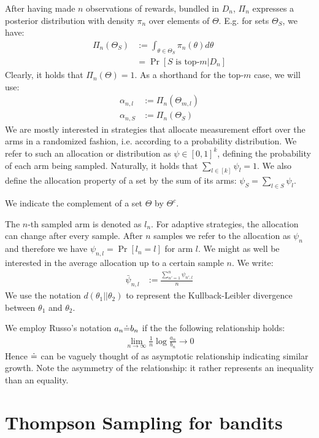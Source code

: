 After having made $n$ observations of rewards, bundled in $D_n$, $\Pi_n$
expresses a posterior distribution with density $\pi_n$ over elements of
$\Theta$. E.g. for sets $\Theta_{S}$, we have:
\begin{align}
  \Pi_n(\Theta_{S}) &:= \int_{\theta \in \Theta_{S}} \pi_n(\theta)
      d\theta \\
    &= \Pr[S \text{ is top-}m | D_n]
\end{align}
Clearly, it holds that $\Pi_n(\Theta) = 1$. As a shorthand for the top-$m$ case, we will use:
\begin{align}
  \alpha_{n, l} &:= \Pi_n(\Theta_{m, l}) \\
  \alpha_{n, S} &:= \Pi_n(\Theta_{S})
\end{align}
We are mostly interested in strategies that allocate measurement effort over the
arms in a randomized fashion, i.e. according to a probability distribution. We
refer to such an allocation or distribution as $\psi \in [0, 1]^k$, defining the
probability of each arm being sampled. Naturally, it holds that $\sum_{l \in
[k]} \psi_l = 1$. We also define the allocation property of a set by the sum of
its arms: $\psi_S = \sum_{l \in S} \psi_l$.

We indicate the complement of a set $\Theta$ by $\Theta^c$.

The $n$-th sampled arm is denoted as $l_n$. For adaptive strategies, the
allocation can change after every sample. After $n$ samples we refer to the
allocation as $\psi_{n}$ and therefore we have $\psi_{n, l} = \Pr[l_n = l]$ for
arm $l$. We might as well be interested in the average allocation up to a
certain sample $n$. We write:
\begin{align}
  \bar{\psi}_{n, l} &:= \frac{\sum_{n' = 1}^{n} \psi_{n', l}}{n}
\end{align}
We use the notation $d(\theta_1||\theta_2)$ to represent the Kullback-Leibler
divergence between $\theta_1$ and $\theta_2$.

We employ Russo's notation $a_n \dot{=} b_n$ if the the following relationship
holds:
\begin{align}
  \lim_{n \rightarrow \infty}\frac{1}{n}\log{\frac{a_n}{b_n}} \rightarrow 0
\end{align}
Hence $\dot{=}$ can be vaguely thought of as asymptotic relationship indicating
similar growth. Note the asymmetry of the relationship: it rather
represents an inequality than an equality.

\section{Thompson Sampling for bandits}

